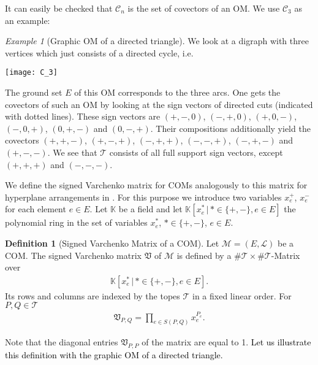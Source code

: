 \documentclass[12pt]{amsart}
\def\Var{{\mathfrak V}}
\def\Tscr{{\mathcal T}}
\def\M{{\mathcal M}}
\theoremstyle{plain}
\numberwithin{Lemma}{\DefaultNumberTheoremWithin}
\numberwithin{Claim}{\DefaultNumberTheoremWithin}
\numberwithin{Theorem}{\DefaultNumberTheoremWithin}
\numberwithin{Corollary}{\DefaultNumberTheoremWithin}
\numberwithin{Proposition}{\DefaultNumberTheoremWithin}
\numberwithin{Conjecture}{\DefaultNumberTheoremWithin}
\numberwithin{Situation}{\DefaultNumberTheoremWithin}
\numberwithin{Note}{\DefaultNumberTheoremWithin}
\theoremstyle{definition}
\newtheorem{Definition}{Definition}
\numberwithin{Definition}{\DefaultNumberTheoremWithin}
\theoremstyle{definition}
\numberwithin{Question}{\DefaultNumberTheoremWithin}
\theoremstyle{definition}
\numberwithin{Problem}{\DefaultNumberTheoremWithin}
\theoremstyle{remark} \newtheorem{Remark}{Remark}
\numberwithin{Remark}{\DefaultNumberTheoremWithin}
\theoremstyle{remark}
\newtheorem{Example}{Example}
\numberwithin{Example}{\DefaultNumberTheoremWithin}
\numberwithin{Case}{Lemma}
\numberwithin{Step}{Lemma}
\newcommand{\new}[1]{\textcolor{black}{#1}}
\begin{document}
It can easily be checked that $\mathcal{C}_n$ is the set of covectors of an OM. We use $\mathcal{C}_3$ as an example:



\begin{Example}[Graphic OM of a directed triangle] \label{ex:cycle} We look at a digraph with three vertices which just consists of a directed cycle, i.e.
 \begin{center}
 \texttt{[image: C\_3]}
 \end{center}
The ground set $E$ of this OM corresponds to the three arcs. One gets the covectors of such an OM by looking at the sign vectors of directed cuts (indicated with dotted lines). These sign vectors are $(+,-,0)$, $(-,+,0)$, $(+,0,-)$, $(-,0,+)$, $(0,+,-)$ and $(0,-,+)$. Their compositions additionally yield the covectors $(+,+,-)$, $(+,-,+)$, $(-,+,+)$, $(-,-,+)$, $(-,+,-)$ and $(+,-,-)$. We see that $\Tscr$ consists of all full support sign vectors, except $(+,+,+)$ and $(-,-,-)$.  

\end{Example}

We define the signed Varchenko matrix for COMs analogously to this matrix for hyperplane arrangements in \cite{AM}. For this purpose we introduce two variables $x_{e}^+$, $x_{e}^-$ for each element $e\in E$. Let $\mathbb{K}$ be a field and let $\mathbb{K}[x_{e}^*\,|\,*\in \{+,-\}, e\in E]$ the polynomial ring in the set of variables $x_{e}^*$, $*\in \{+,-\}$, $e\in E$.

\begin{Definition}[Signed Varchenko Matrix of a COM]\label{def:signed} Let $\M=(E,\mathcal{L})$ be a COM. The signed Varchenko matrix $\Var$ of $\mathcal{M}$ is defined by a $\# \Tscr \times \# \Tscr$-Matrix over 
\begin{align*}
\mathbb{K}[x_{e}^*\,|\,*\in \{+,-\}, e\in E].
\end{align*}
Its rows and columns are indexed by the topes $\Tscr$ in a fixed linear order. For $P,Q \in \Tscr$
\begin{align*}
\Var_{P,Q} = \prod_{e \in S(P,Q)} x_{e}^{P_e}.
\end{align*}
\end{Definition} 
Note that the diagonal entries $\Var_{P,P}$ of the matrix are equal to 1. \new{Let us illustrate this definition with the graphic OM of a directed triangle.}
\end{document}
